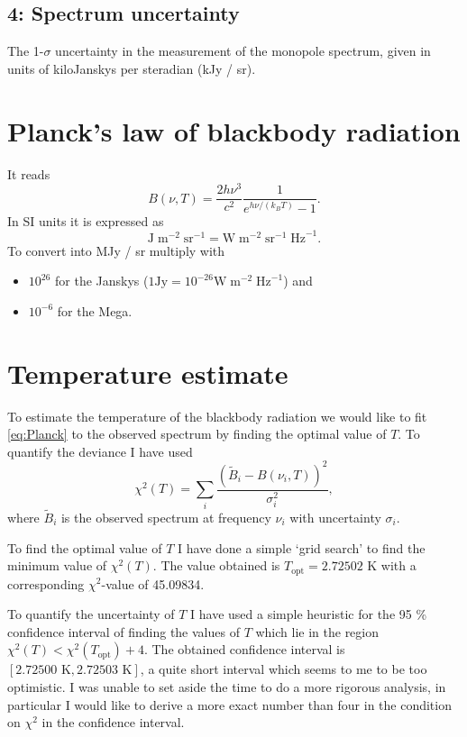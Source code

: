 \documentclass[a4paper,onecolumn,12pt]{revtex4-1}
\begin{document}
\subsection*{4: Spectrum uncertainty}

The 1-\(\sigma\) uncertainty in the measurement of the monopole spectrum, given in units of kiloJanskys per steradian (kJy / sr).





\section{Planck's law of blackbody radiation}

It reads
\begin{equation}
  \label{eq:Planck}
  B(\nu, T)
    = \frac{2 h \nu^3}{c^2} \frac{1}{e^{h \nu / (k_B T)} - 1}.
\end{equation}
In SI units it is expressed as
\begin{equation}
  \text{J} \;\text{m}^{-2} \;\text{sr}^{-1}
    = \text{W} \; \text{m}^{-2} \; \text{sr}^{-1} \; \text{Hz}^{-1}.
\end{equation}
To convert into MJy / sr multiply with
\begin{itemize}
  \item \(10^{26}\) for the Janskys (\(1 \text{Jy} = 10^{-26} \text{W} \; \text{m}^{-2} \;\text{Hz}^{-1}\)) and
  \item \(10^{-6}\) for the Mega.
\end{itemize}





\section{Temperature estimate}

To estimate the temperature of the blackbody radiation we would like to fit \eqref{eq:Planck} to the observed spectrum by finding the optimal value of \(T\). To quantify the deviance I have used
\begin{equation}
  \chi^2(T)
    = \sum_i \frac{(\tilde B_i - B(\nu_i, T))^2}{\sigma_i^2},
\end{equation}
where \(\tilde B_i\) is the observed spectrum at frequency \(\nu_i\) with uncertainty \(\sigma_i\).

To find the optimal value of \(T\) I have done a simple `grid search' to find the minimum value of \(\chi^2(T)\). The value obtained is \(T_\text{opt} = 2.72502\) K with a corresponding \(\chi^2\)-value of 45.09834.

To quantify the uncertainty of \(T\) I have used a simple heuristic for the 95 \% confidence interval of finding the values of \(T\) which lie in the region
\(\chi^2(T) < \chi^2(T_\text{opt}) + 4\).
The obtained confidence interval is
\([2.72500 \text{ K}, 2.72503 \text{ K}]\),
a quite short interval which seems to me to be too optimistic. I was unable to set aside the time to do a more rigorous analysis, in particular I would like to derive a more exact number than four in the condition on \(\chi^2\) in the confidence interval.
\end{document}
